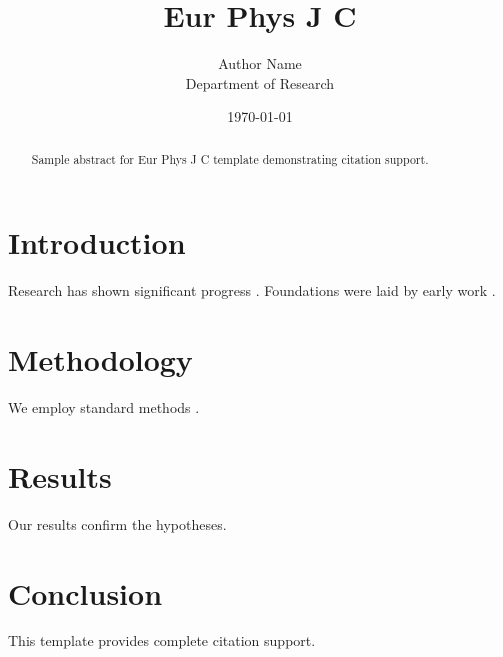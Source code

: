 \documentclass{llncs}
\title{Eur Phys J C}
\author{Author Name \\ \small Department of Research}
\date{\today}
\begin{document}
\maketitle

\begin{abstract}
Sample abstract for Eur Phys J C template demonstrating citation support.
\end{abstract}

\section{Introduction}
Research has shown significant progress \citep{einstein1905}. Foundations were laid by early work \citep{turing1950}.

\section{Methodology}
We employ standard methods \citep{knuth1984}.

\section{Results}
Our results confirm the hypotheses.

\section{Conclusion}
This template provides complete citation support.



\end{document}
